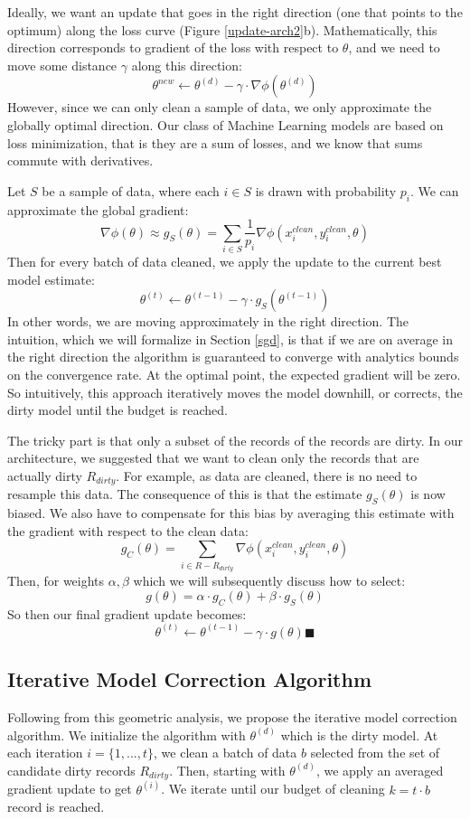 Ideally, we want an update that goes in the right direction (one that points to the optimum) along the loss curve (Figure \ref{update-arch2}b).
Mathematically, this direction corresponds to gradient of the loss with respect to $\theta$, and we need to move some distance $\gamma$ along this direction:
\[
\theta^{new} \leftarrow \theta^{(d)} - \gamma \cdot \nabla\phi(\theta^{(d)})
\]
However, since we can only clean a sample of data, we only approximate the globally optimal direction.
Our class of Machine Learning models are based on loss minimization, that is they are a sum of losses, and we know that sums commute with derivatives.

Let $S$ be a sample of data, where each $i \in S$ is drawn with probability $p_i$.
We can approximate the global gradient:
\[
\nabla\phi(\theta) \approx g_{S}(\theta) = \sum_{i \in S}\frac{1}{p_i}\nabla\phi(x_i^{clean},y_i^{clean},\theta)
\]
Then for every batch of data cleaned, we apply the update to the current best model estimate:
\[
\theta^{(t)} \leftarrow \theta^{(t-1)} - \gamma \cdot g_{S}(\theta^{(t-1)})
\]
In other words, we are moving approximately in the right direction.
The intuition, which we will formalize in Section \ref{sgd}, is that if we are on average in the right direction the algorithm is guaranteed to converge with analytics bounds on the convergence rate.
At the optimal point, the expected gradient will be zero.
So intuitively, this approach iteratively moves the model downhill, or corrects, the dirty model until the budget is reached.

The tricky part is that only a subset of the records of the records are dirty.
In our architecture, we suggested that we want to clean only the records that
are actually dirty $R_{dirty}$.
For example, as data are cleaned, there is no need to resample this data.
The consequence of this is that the estimate $g_{S}(\theta)$ is now biased.
We also have to compensate for this bias by averaging this estimate with the gradient with respect to the clean data:
\[
g_C(\theta) = \sum_{i \in R - R_{dirty}}\nabla\phi(x_i^{clean},y_i^{clean},\theta)
\]
Then, for weights $\alpha,\beta$ which we will subsequently discuss how to select:
\[
g(\theta) = \alpha \cdot g_C(\theta) + \beta \cdot g_S(\theta)
\]
So then our final gradient update becomes:
\[
\theta^{(t)} \leftarrow \theta^{(t-1)} - \gamma \cdot g(\theta) \blacksquare
\]

\subsection{Iterative Model Correction Algorithm}
Following from this geometric analysis, we propose the iterative model correction algorithm.
We initialize the algorithm with $\theta^{(d)}$ which is the dirty model.
At each iteration $i=\{1,...,t\}$, we clean a batch of data $b$ selected from the set of candidate dirty records $R_{dirty}$.
Then, starting with $\theta^{(d)}$, we apply an averaged gradient update to get $\theta^{(i)}$.
We iterate until our budget of cleaning $k = t \cdot b$ record is reached.

